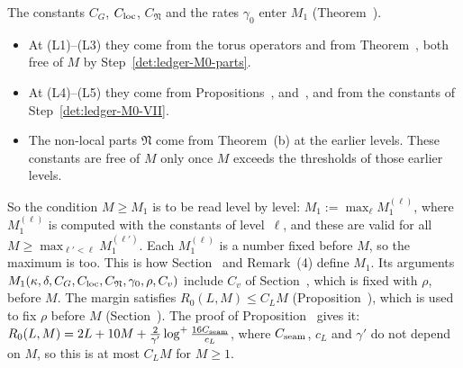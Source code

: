\begin{detail}
\begin{step}
The constants $C_G$, $C_{\rm loc}$, $C_{\mathfrak N}$ and the rates $\gamma_0$ enter $M_1$ (Theorem~).
\begin{itemize}
\item At (L1)--(L3) they come from the torus operators and from Theorem~, both free of $M$ by Step~\ref{det:ledger-M0-parts}.
\item At (L4)--(L5) they come from Propositions~,  and~, and from the constants of Step~\ref{det:ledger-M0-VII}.
\item The non-local parts $\mathfrak N$ come from Theorem~(b) at the earlier levels. These constants are free of $M$ only once $M$ exceeds the thresholds of those earlier levels.
\end{itemize}
So the condition $M\ge M_1$ is to be read level by level: $M_1:=\max_\ell M_1^{(\ell)}$, where $M_1^{(\ell)}$ is computed with the constants of level~$\ell$, and these are valid for all $M\ge\max_{\ell'<\ell}M_1^{(\ell')}$. Each $M_1^{(\ell)}$ is a number fixed before $M$, so the maximum is too. This is how Section~ and Remark~(4) define $M_1$. Its arguments $M_1(\kappa,\delta,C_G,C_{\rm loc},C_{\mathfrak N},\gamma_0,\rho,C_v)$ include $C_v$ of Section~, which is fixed with $\rho$, before $M$. The margin satisfies $R_0(L,M)\le C_LM$ (Proposition~), which is used to fix $\rho$ before $M$ (Section~). The proof of Proposition~ gives it: $R_0(L,M)=2L+10M+\frac2{\gamma'}\log^+\frac{16C_{\rm seam}}{c_L}$, where $C_{\rm seam}$, $c_L$ and $\gamma'$ do not depend on $M$, so this is at most $C_LM$ for $M\ge1$.
\end{step}
\end{detail}

